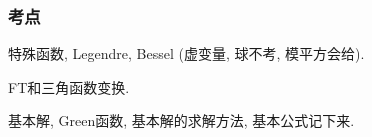 \documentclass[hidelinks]{ctexart}
\begin{document}
\subsubsection{考点} %
\label{ssub:考点}

\begin{cenum}
    \item 特殊函数, Legendre, Bessel (虚变量, 球不考, 模平方会给).
    \item FT和三角函数变换.
    \item 基本解, Green函数, 基本解的求解方法, 基本公式记下来.
\end{cenum}

\end{document}
